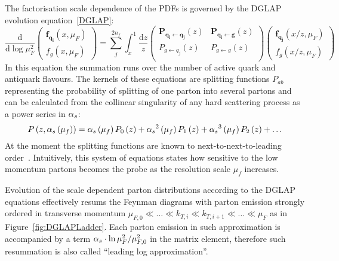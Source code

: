 The factorisation scale dependence of the PDFs is governed by the DGLAP evolution equation~\ref{DGLAP}:
\begin{equation}
\frac{\mathrm{d}}{\mathrm{d}\log{\mu_F^2}}
 \begin{pmatrix}
	\mathbf{f_{q_i}}\left(x,\mu_F\right) \\
	f_g\left(x,\mu_F\right)
 \end{pmatrix} = 
\sum_j^{2n_f}{\int_x^1{\frac{\mathrm{d}z}{z}
 \begin{pmatrix}
  \mathbf{P_{q_i \leftarrow q_j}}\left(z\right) & \mathbf{P_{q_i \leftarrow  g}}\left(z\right) \\
  P_{g \leftarrow q_j}\left(z\right) & P_{g \leftarrow g}\left(z\right) \\
 \end{pmatrix}
 \begin{pmatrix}
	\mathbf{f_{q_j}}\left(x/z,\mu_F\right) \\
	f_g\left(x/z,\mu_F\right)
 \end{pmatrix}
}}
\end{equation}
In this equation the summation runs over the number of active quark and antiquark flavours. The kernels of these equations are splitting functions $P_{ab}$ representing the probability of splitting of one parton into several partons and can be calculated from the collinear singularity of any hard scattering process as a power series in $\mbox{$\alpha_{s}$}$:
\begin{equation}
P\left(z,\mbox{$\alpha_{s}$}\left(\mu_f\right)\right) = \mbox{$\alpha_{s}$}\left(\mu_f\right) P_0\left(z\right) + \mbox{$\alpha_{s}$}^2\left(\mu_f\right)P_1\left(z\right) + \mbox{$\alpha_{s}$}^3\left(\mu_f\right)P_2\left(z\right) + \ldots
\label{eq:splittingfunc}
\end{equation}
At the moment the splitting functions are known to next-to-next-to-leading order~\cite{nnlosplittingfinctions}. Intuitively, this system of equations states how sensitive to the low momentum partons becomes the probe as the resolution scale $\mu_f$ increases. %

Evolution of the scale dependent parton distributions according to the DGLAP equations effectively resums the Feynman diagrams with parton emission strongly ordered in transverse momentum $ \mu_{F,0} \ll \ldots \ll k_{T,i} \ll k_{T,i+1} \ll \ldots \ll \mu_F$ as in Figure~\ref{fig:DGLAPLadder}. Each parton emission in such approximation is accompanied by a term $\mbox{$\alpha_{s}$}\cdot\ln{\mu^2_F/\mu^2_{F,0}}$ in the matrix element, therefore such resummation is also called ``leading log approximation''.

